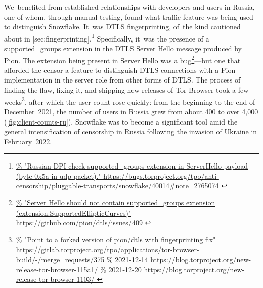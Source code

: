 \documentclass[letterpaper,twocolumn]{article}
\newlength{\urlfootnotesize}
\newcommand{\urlfootnote}[1]{\footnote{
\raggedright\fontsize{\urlfootnotesize}{\urlfootnotesize}\selectfont\url{#1}
}}
\begin{document}
We~benefited from established relationships
with developers and users in Russia,
one of whom, through manual testing,
found what traffic feature was being used to distinguish Snowflake.
It~was DTLS fingerprinting,
of~the kind cautioned about in \autoref{sec:fingerprinting}.\urlfootnote{
https://bugs.torproject.org/tpo/anti-censorship/pluggable-transports/snowflake/40014\#note_2765074
}
Specifically, it~was the presence of a
\mbox{supported\_groups} extension in the DTLS Server Hello message produced by Pion.
The extension being present in Server Hello was a bug\urlfootnote{
https://github.com/pion/dtls/issues/409
}---but
one that afforded the censor a feature
to distinguish DTLS connections with a Pion implementation in the server role
from other forms of DTLS.
The process of finding the flaw, fixing it,
and shipping new releases of Tor Browser took a few weeks\urlfootnote{
https://gitlab.torproject.org/tpo/applications/tor-browser-build/-/merge_requests/375
},
after which the user count rose quickly:
from the beginning to the end of December~2021,
the number of users in Russia grew from about 400 to over 4,000
(\autoref{fig:client-counts-ru}).
Snowflake was to become a significant tool
amid the general intensification of censorship in Russia
following the invasion of Ukraine in February~2022.
\end{document}
